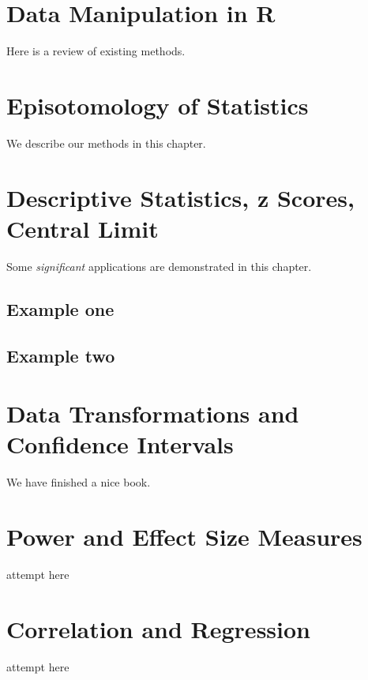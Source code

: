 \documentclass[]{book}
\theoremstyle{definition}
\theoremstyle{definition}
\theoremstyle{definition}
\theoremstyle{remark}
\begin{document}
\chapter{Data Manipulation in R}\label{data-manipulation-in-r}

Here is a review of existing methods.

\chapter{Episotomology of Statistics}\label{episotomology-of-statistics}

We describe our methods in this chapter.

\chapter{Descriptive Statistics, z Scores, Central
Limit}\label{descriptive-statistics-z-scores-central-limit}

Some \emph{significant} applications are demonstrated in this chapter.

\section{Example one}\label{example-one}

\section{Example two}\label{example-two}

\chapter{Data Transformations and Confidence
Intervals}\label{data-transformations-and-confidence-intervals}

We have finished a nice book.

\chapter{Power and Effect Size
Measures}\label{power-and-effect-size-measures}

attempt here

\chapter{Correlation and Regression}\label{correlation-and-regression}

attempt here
\end{document}
